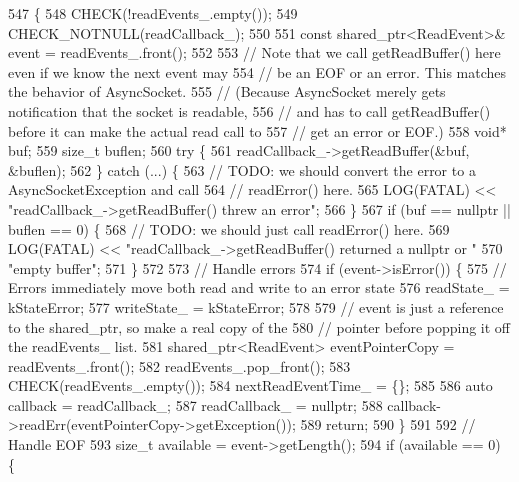 \begin{DoxyCode}
547                                      \{
548   CHECK(!readEvents_.empty());
549   CHECK\_NOTNULL(readCallback_);
550 
551   \textcolor{keyword}{const} shared\_ptr<ReadEvent>& \textcolor{keyword}{event} = readEvents_.front();
552 
553   \textcolor{comment}{// Note that we call getReadBuffer() here even if we know the next event may}
554   \textcolor{comment}{// be an EOF or an error.  This matches the behavior of AsyncSocket.}
555   \textcolor{comment}{// (Because AsyncSocket merely gets notification that the socket is readable,}
556   \textcolor{comment}{// and has to call getReadBuffer() before it can make the actual read call to}
557   \textcolor{comment}{// get an error or EOF.)}
558   \textcolor{keywordtype}{void}* buf;
559   \textcolor{keywordtype}{size\_t} buflen;
560   \textcolor{keywordflow}{try} \{
561     readCallback_->getReadBuffer(&buf, &buflen);
562   \} \textcolor{keywordflow}{catch} (...) \{
563     \textcolor{comment}{// TODO: we should convert the error to a AsyncSocketException and call}
564     \textcolor{comment}{// readError() here.}
565     LOG(FATAL) << \textcolor{stringliteral}{"readCallback\_->getReadBuffer() threw an error"};
566   \}
567   \textcolor{keywordflow}{if} (buf == \textcolor{keyword}{nullptr} || buflen == 0) \{
568     \textcolor{comment}{// TODO: we should just call readError() here.}
569     LOG(FATAL) << \textcolor{stringliteral}{"readCallback\_->getReadBuffer() returned a nullptr or "}
570       \textcolor{stringliteral}{"empty buffer"};
571   \}
572 
573   \textcolor{comment}{// Handle errors}
574   \textcolor{keywordflow}{if} (event->isError()) \{
575     \textcolor{comment}{// Errors immediately move both read and write to an error state}
576     readState_ = kStateError;
577     writeState_ = kStateError;
578 
579     \textcolor{comment}{// event is just a reference to the shared\_ptr, so make a real copy of the}
580     \textcolor{comment}{// pointer before popping it off the readEvents\_ list.}
581     shared\_ptr<ReadEvent> eventPointerCopy = readEvents_.front();
582     readEvents_.pop\_front();
583     CHECK(readEvents_.empty());
584     nextReadEventTime_ = \{\};
585 
586     \textcolor{keyword}{auto} callback = readCallback_;
587     readCallback_ = \textcolor{keyword}{nullptr};
588     callback->readErr(eventPointerCopy->getException());
589     \textcolor{keywordflow}{return};
590   \}
591 
592   \textcolor{comment}{// Handle EOF}
593   \textcolor{keywordtype}{size\_t} available = \textcolor{keyword}{event}->getLength();
594   \textcolor{keywordflow}{if} (available == 0) \{

\end{DoxyCode}

